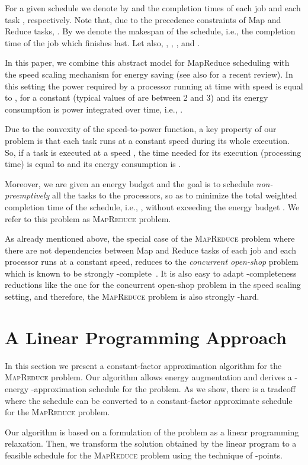 \documentclass{llncs}
\newcommand{\mr}{\textsc{MapReduce}\xspace}
\begin{document}
For a given schedule we denote by   and  the completion times of each
job  and each  task , respectively.
Note that, due to the precedence constraints of Map and Reduce tasks, .
By  we denote the makespan of the schedule, i.e., the completion time of the job which finishes last.
Let also, , ,
,  and .

In this paper, we combine this abstract model for MapReduce scheduling with the speed scaling mechanism for energy saving \cite{YaoDS95}
(see also \cite{Albers11} for a recent review).
In this setting the power required by a processor running at time  with speed  
is equal to , for a constant  (typical values of  are between 2 and 3)
and its energy consumption  is power integrated over  time, i.e., .


Due to the convexity of the speed-to-power function,
a key property of our problem is that each task runs at a constant speed during its whole execution.
So, if a task  is executed at a speed , the time needed for
its execution (processing time) is equal to
 and its energy consumption is
.

Moreover, we are given an energy budget  and the goal is to schedule \emph{non-preemptively} all the tasks to the  processors,
so as to minimize the total weighted completion time of the schedule, i.e., , without exceeding the energy budget .
We refer to this problem as \mr problem.

As already mentioned above, the special case of the \mr problem where there are not dependencies between Map and Reduce tasks of each job
and each processor runs at a constant speed, reduces to the \emph{concurrent open-shop} problem which is known to be strongly -complete~\cite{Roemer06}.
It is also easy to adapt -completeness reductions like the one for the concurrent open-shop problem in the speed scaling setting,
and therefore, the \mr problem is also strongly -hard.

\section{A Linear Programming Approach}\label{se:lpa}

In this section we present a constant-factor approximation algorithm for the \mr problem. Our algorithm allows energy augmentation and derives a -energy -approximation schedule for the problem. As we show, there is a tradeoff where the schedule can be converted to a constant-factor approximate schedule for the \mr problem.

Our algorithm is based on a formulation of the problem as a linear programming relaxation.
Then, we transform the solution obtained by the linear program to a feasible schedule for the \mr problem using the technique of -points.
\end{document}
